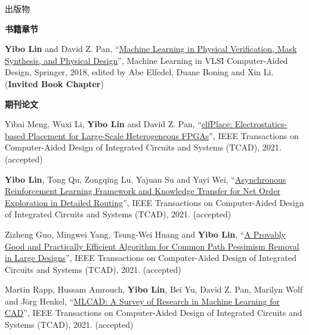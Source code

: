 \begin{rSection}{出版物}



\textbf{书籍章节}
        

\begin{description}[font=\normalfont]
    

\item[{[B1]}]{
        \textbf{Yibo Lin} and David Z. Pan, 
    ``\href{http://dx.doi.org/10.1007/978-3-030-04666-8_4}{Machine Learning in Physical Verification, Mask Synthesis, and Physical Design}'', 
    Machine Learning in VLSI Computer-Aided Design, Springer, 2018, edited by Abe Elfedel, Duane Boning and Xin Li.
    (\textbf{Invited Book Chapter})
}
            

\end{description}
    

\textbf{期刊论文}
        

\begin{description}[font=\normalfont]
    

\item[{[J31]}]{
        Yibai Meng, Wuxi Li, \textbf{Yibo Lin} and David Z. Pan, 
    ``\href{https://doi.org/10.1109/TCAD.2021.3053191}{elfPlace: Electrostatics-based Placement for Large-Scale Heterogeneous FPGAs}'', 
    IEEE Transactions on Computer-Aided Design of Integrated Circuits and Systems (TCAD), 2021.
    (accepted)
}
            

\item[{[J30]}]{
        \textbf{Yibo Lin}, Tong Qu, Zongqing Lu, Yajuan Su and Yayi Wei, 
    ``\href{https://doi.org/10.1109/TCAD.2021.3117505}{Asynchronous Reinforcement Learning Framework and Knowledge Transfer for Net Order Exploration in Detailed Routing}'', 
    IEEE Transactions on Computer-Aided Design of Integrated Circuits and Systems (TCAD), 2021.
    (accepted)
}
            

\item[{[J29]}]{
        Zizheng Guo, Mingwei Yang, Tsung-Wei Huang and \textbf{Yibo Lin}, 
    ``\href{https://doi.org/10.1109/TCAD.2021.3124758}{A Provably Good and Practically Efficient Algorithm for Common Path Pessimism Removal in Large Designs}'', 
    IEEE Transactions on Computer-Aided Design of Integrated Circuits and Systems (TCAD), 2021.
    (accepted)
}
            

\item[{[J28]}]{
        Martin Rapp, Hussam Amrouch, \textbf{Yibo Lin}, Bei Yu, David Z. Pan, Marilyn Wolf and Jörg Henkel, 
    ``\href{https://doi.org/10.1109/TCAD.2021.3124762}{MLCAD: A Survey of Research in Machine Learning for CAD}'', 
    IEEE Transactions on Computer-Aided Design of Integrated Circuits and Systems (TCAD), 2021.
    (accepted)
}
            


\end{description}
\end{rSection}
